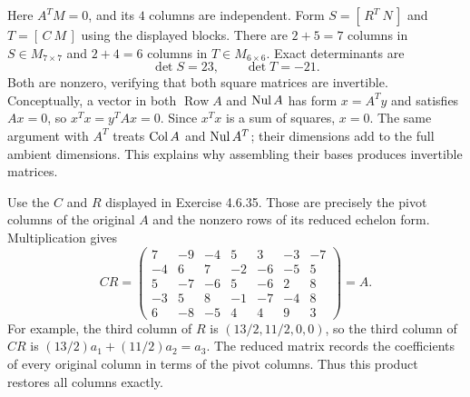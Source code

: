 Here $A^TM=0$, and its $4$ columns are independent. Form $S=[\,R^T\ N\,]$ and $T=[\,C\ M\,]$ using the displayed blocks. There are $2+5=7$ columns in $S\in M_{7\times 7}$ and $2+4=6$ columns in $T\in M_{6\times 6}$. Exact determinants are
\[ \det S=23,\qquad\det T=-21.\]
Both are nonzero, verifying that both square matrices are invertible. Conceptually, a vector in both $\operatorname{Row}A$ and $\operatorname{Nul} A$ has form $x=A^Ty$ and satisfies $Ax=0$, so $x^Tx=y^TAx=0$. Since $x^Tx$ is a sum of squares, $x=0$. The same argument with $A^T$ treats $\operatorname{Col} A$ and $\operatorname{Nul} A^T$; their dimensions add to the full ambient dimensions. This explains why assembling their bases produces invertible matrices.

Use the $C$ and $R$ displayed in Exercise 4.6.35. Those are precisely the
pivot columns of the original $A$ and the nonzero rows of its reduced
echelon form. Multiplication gives
\[
 CR=\begin{pmatrix}
 7&-9&-4&5&3&-3&-7\\-4&6&7&-2&-6&-5&5\\
 5&-7&-6&5&-6&2&8\\-3&5&8&-1&-7&-4&8\\6&-8&-5&4&4&9&3
 \end{pmatrix}=A.
\]
For example, the third column of $R$ is $(13/2,11/2,0,0)$, so the third
column of $CR$ is $(13/2)a_1+(11/2)a_2=a_3$.
The reduced matrix records the coefficients of every original column in
terms of the pivot columns. Thus this product restores all columns exactly.

